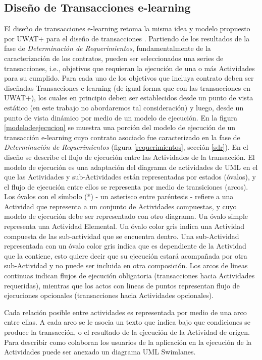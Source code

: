 \subsection{Diseño de Transacciones e-learning}

El diseño de transacciones e-learning retoma la misma idea y modelo propuesto
por UWAT+ para el diseño de transacciones \cite{UWAT}. Partiendo de los
resultados de la fase de \textit{Determinación de Requerimientos},
fundamentalmente de la caracterización de los contratos, pueden ser
seleccionados una series de transacciones, i.e., objetivos que requieran la
ejecución de una o más Actividades para su cumplido. Para cada uno de los
objetivos que incluya contrato deben ser diseñadas Transacciones e-learning (de
igual forma que con las transacciones en UWAT+), los cuales en principio deben
ser establecidos desde un punto de vista estático (en este trabajo no
abordaremos tal consideración) y luego, desde un punto de vista dinámico por
medio de un modelo de ejecución. En la figura \ref{modelodeejecucion} se muestra
una porción del modelo de ejecución de un transacción e-learning cuyo contrato
asociado fue caracterizado en la fase de \textit{Determinación de
Requerimientos} (figura \ref{requerimientos}, sección \ref{sdr}). En el diseño
se describe el flujo de ejecución entre las Actividades de la transacción. El
modelo de ejecución es una adaptación del diagrama de actividades de UML
\cite{7} en el que las Actividades y sub-Actividades están representadas por
estados (óvalos), y el flujo de ejecución entre ellos se representa por medio de
transiciones (arcos). Los óvalos con el símbolo (*) - un asterisco entre
paréntesis - refiere a una Actividad que representa a un conjunto de Actividades
compuestas, y cuyo modelo de ejecución debe ser representado con otro diagrama.
Un óvalo simple representa una Actividad Elemental. Un óvalo color gris indica
una Actividad compuesta de las sub-actividad que se encuentra dentro. Una
sub-Actividad representada con un óvalo color gris indica que es dependiente de
la Actividad que la contiene, esto quiere decir que su ejecución estará
acompañada por otra sub-Actividad y no puede ser incluida en otra composición.
Los arcos de lineas continuas indican flujos de ejecución obligatoria
(transacciones hacia Actividades requeridas), mientras que los actos con lineas
de puntos representan flujo de ejecuciones opcionales  (transacciones hacia
Actividades opcionales).
 
Cada relación posible entre actividades es representada por medio de una arco
entre ellas. A cada arco se le asocia un texto que indica bajo que condiciones
se produce la transacción, o el resultado de la ejecución de la Actividad de
origen. Para describir como colaboran los usuarios de la aplicación en la
ejecución de la Actividades puede ser anexado un diagrama UML Swimlanes. 

